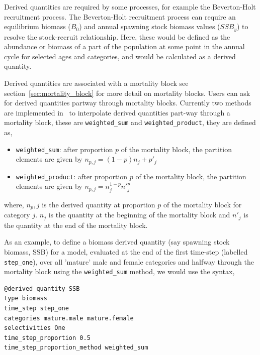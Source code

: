 Derived quantities are required by some processes, for example the Beverton-Holt recruitment process. The Beverton-Holt recruitment process can require an equilibrium biomass ($B_0$) and annual spawning stock biomass values ($SSB_y$) to resolve the stock-recruit relationship. Here, these would be defined as the abundance or biomass of a part of the population at some point in the annual cycle for selected ages and categories, and would be calculated as a derived quantity.

Derived quantities are associated with a mortality block see section~\ref{sec:mortality_block} for more detail on mortality blocks. Users can ask for derived quantities partway through mortality blocks. Currently two methods are implemented in \CNAME\ to interpolate derived quantities part-way through a mortality block, these are \texttt{weighted\_sum} and \texttt{weighted\_product}, they are defined as,
\begin{itemize}
	\item \texttt{weighted\_sum}: after proportion $p$ of the mortality block, the partition elements are given by $n_{p,j} = (1 - p)n_j + p'_j$
	
	\item \texttt{weighted\_product}: after proportion $p$ of the mortality block, the partition elements are given by $n_{p,j} = n_j^{1-p} n'^p_j$
\end{itemize}
where, $n_p,j$ is the derived quantity at proportion $p$ of the mortality block for category $j$. $n_j$ is the quantity at the beginning of the mortality block and $n'_j$ is the quantity at the end of the mortality block.

As an example, to define a biomass derived quantity (say spawning stock biomass, SSB) for a model, evaluated at the end of the first time-step (labelled \texttt{step\_one}), over all 'mature' male and female categories and halfway through the mortality block using the \texttt{weighted\_sum} method, we would use the syntax,

{\small{\begin{verbatim}
@derived_quantity SSB
type biomass
time_step step_one
categories mature.male mature.female
selectivities One
time_step_proportion 0.5
time_step_proportion_method weighted_sum
\end{verbatim}}}

\subsection{\label{sec:age-at-age}}

